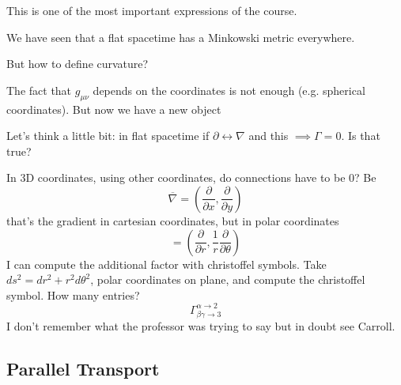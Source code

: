  This is one of the most important expressions of the course. \par
 We have seen that a flat spacetime has a Minkowski metric everywhere. \par
 But how to define curvature? \par
 The fact that $g_{\mu \nu }$ depends on the coordinates is not enough (e.g. spherical coordinates). But now we have a new object\par
 Let's think a little bit: in flat spacetime if $\partial \leftrightarrow \nabla $ and this $\implies \Gamma  = 0$. Is that true? \par
 
 In 3D coordinates, using other coordinates, do connections have to be 0? Be
 \[
 \overline{\nabla } = \left( \frac{\partial }{\partial x} , \frac{\partial }{\partial y}  \right)
 \]
 that's the gradient in cartesian coordinates, but in polar coordinates
 \[
 = \left( \frac{\partial }{\partial r} , \frac{1}{r} \frac{\partial }{\partial \theta }  \right)
 \]
 I can compute the additional factor with christoffel symbols.
 Take $ds^{2} = dr^{2} + r^{2}d\theta ^{2}$, polar coordinates on plane, and compute the christoffel symbol. How many entries?
 \[
 \Gamma ^{\alpha \to 2}_{\beta \gamma \to 3} 
 \]
 I don't remember what the professor was trying to say but in doubt see Carroll.

 \subsection{Parallel Transport}
 




